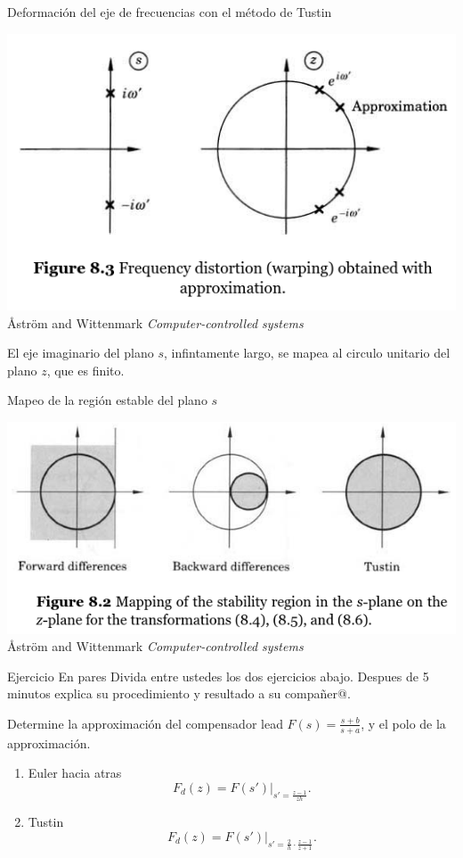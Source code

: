 \documentclass[presentation,aspectratio=1610]{beamer}
\begin{document}
\begin{frame}[label={sec:org30bbbaa}]{Deformación del eje de frecuencias con el método de Tustin}
\begin{center}
 \includegraphics[width=0.6\linewidth]{../../figures/fig8_3.png}\\
{\tiny Åström and Wittenmark \emph{Computer-controlled systems}}
\end{center}
El eje imaginario del plano \(s\), infintamente largo, se mapea al circulo unitario del plano \(z\), que es finito.
\end{frame}
\begin{frame}[label={sec:orgb569462}]{Mapeo de la región estable del plano \(s\)}
\begin{center}
 \includegraphics[width=0.79\linewidth]{../../figures/fig8-2.png}\\
{\tiny Åström and Wittenmark \emph{Computer-controlled systems}}
\end{center}
\end{frame}

\begin{frame}[label={sec:org14729bd}]{Ejercicio}
\alert{En pares} Divida entre ustedes los dos ejercicios abajo. Despues de 5 minutos explica su procedimiento y resultado a su compañer@.

Determine la approximación del compensador lead \(F(s) = \frac{s+b}{s+a}\), y el polo de la approximación.
\begin{enumerate}
\item Euler hacia atras
\[ F_d(z) = F(s')|_{s'=\frac{z-1}{zh}}. \]
\item Tustin
\[ F_d(z) = F(s')|_{s'=\frac{2}{h}\cdot \frac{z-1}{z+1}}. \]
\end{enumerate}
\end{frame}
\end{document}

